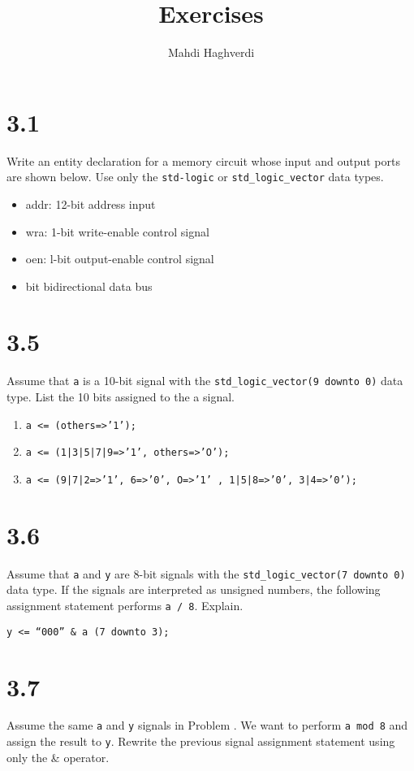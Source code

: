 \documentclass[dvipsnames, svgnames, x11names, a4paper,12pt]{article}
\title{Exercises}
\author{Mahdi Haghverdi}
\begin{document}
    \maketitle
    \tableofcontents
    
\section{3.1}
Write an entity declaration for a memory circuit whose input and output ports are
shown below. Use only the \texttt{std-logic} or \texttt{std\_logic\_vector} data types.

\begin{itemize}
    \item addr: 12-bit address input
    \item  wra: 1-bit write-enable control signal
    \item oen: l-bit output-enable control signal
    \item  bit bidirectional data bus
\end{itemize}


\section{3.5}    
Assume that \texttt{a} is a 10-bit signal with the \texttt{std\_logic\_vector(9 downto 0)} data
type. List the 10 bits assigned to the a signal.

\begin{enumerate}[label=(\alph*)]
    \item \texttt{a <= (others=>’1’);}
    \item \texttt{a <= (1|3|5|7|9=>’1’, others=>’O’);}
    \item \texttt{a <= (9|7|2=>’1’, 6=>’0’, O=>’1’ , 1|5|8=>’0’, 3|4=>’0’);}
\end{enumerate}

\section{3.6}\label{3.6}
Assume that \texttt{a} and \texttt{y} are 8-bit signals with the \texttt{std\_logic\_vector(7 downto 0)}
data type. If the signals are interpreted as unsigned numbers, the following assignment
statement performs \texttt{a / 8}. Explain.
    
\texttt{y <= “000” \& a (7 downto 3);}   

\section{3.7}    
Assume the same \texttt{a} and \texttt{y} signals in Problem . We want to perform \texttt{a mod 8} and
assign the result to \texttt{y}. Rewrite the previous signal assignment statement using only the \&
operator.
\end{document}
